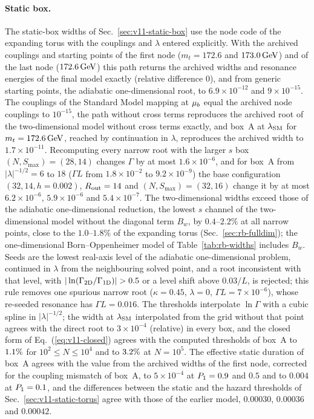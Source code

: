 \paragraph{Static box.}
The static-box widths of Sec.~\ref{sec:v11-static-box} use the node code of the expanding torus with the couplings and $\lambda$ entered explicitly.
With the archived couplings and starting points of the first node ($m_t=172.6$ and $173.0\,\mathrm{GeV}$) and of the last node ($172.6\,\mathrm{GeV}$) this path returns the archived widths and resonance energies of the final model exactly (relative difference $0$), and from generic starting points, the adiabatic one-dimensional root, to $6.9\times10^{-12}$ and $9\times10^{-15}$. %
The couplings of the Standard Model mapping at $\mu_b$ equal the archived node couplings to $10^{-15}$, the path without cross terms reproduces the archived root of the two-dimensional model without cross terms exactly, and box~A at $\lambda_{\rm SM}$ for $m_t=172.6\,\mathrm{GeV}$, reached by continuation in $\lambda$, reproduces the archived width to $1.7\times10^{-11}$. %
Recomputing every narrow root with the larger $s$ box $(N,S_{\max})=(28,14)$ changes $\Gamma$ by at most $1.6\times10^{-6}$, and for box~A from $|\lambda|^{-1/2}=6$ to $18$ ($\Gamma L$ from $1.8\times10^{-2}$ to $9.2\times10^{-9}$) the base configuration $(32,14,h=0.002)$, $R_{\rm out}=14$ and $(N,S_{\max})=(32,16)$ change it by at most $6.2\times10^{-6}$, $5.9\times10^{-6}$ and $5.4\times10^{-7}$. %
The two-dimensional widths exceed those of the adiabatic one-dimensional reduction, the lowest $s$ channel of the two-dimensional model without the diagonal term $B_w$, by $0.4$--$2.2\%$ at all narrow points, close to the $1.0$--$1.8\%$ of the expanding torus (Sec.~\ref{sec:rb-fulldim}); the one-dimensional Born--Oppenheimer model of Table~\ref{tab:rb-widths} includes $B_w$. %
Seeds are the lowest real-axis level of the adiabatic one-dimensional problem, continued in $\lambda$ from the neighbouring solved point, and a root inconsistent with that level, with $|\ln(\Gamma_{\rm 2D}/\Gamma_{\rm 1D})|>0.5$ or a level shift above $0.03/L$, is rejected; this rule removes one spurious narrow root ($\kappa=0.45$, $\lambda=0$, $\Gamma L=7\times10^{-6}$), whose re-seeded resonance has $\Gamma L=0.016$. %
The thresholds interpolate $\ln\Gamma$ with a cubic spline in $|\lambda|^{-1/2}$; the width at $\lambda_{\rm SM}$ interpolated from the grid without that point agrees with the direct root to $3\times10^{-4}$ (relative) in every box, and the closed form of Eq.~(\ref{eq:v11-closed}) agrees with the computed thresholds of box~A to $1.1\%$ for $10^2\le N\le10^4$ and to $3.2\%$ at $N=10^5$. %
The effective static duration of box~A agrees with the value from the archived widths of the first node, corrected for the coupling mismatch of box~A, to $5\times10^{-4}$ at $P_1=0.9$ and $0.5$ and to $0.004$ at $P_1=0.1$, and the differences between the static and the hazard thresholds of Sec.~\ref{sec:v11-static-torus} agree with those of the earlier model, $0.00030$, $0.00036$ and $0.00042$. %

